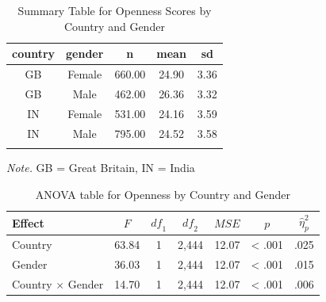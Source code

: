 \documentclass[
  english,
  man, fleqn, noextraspace]{apa6}
\begin{document}
\begin{table}[tbp]

\begin{center}
\begin{threeparttable}

\caption{\label{tab:anovaDescriptives}Summary Table for Openness Scores by Country and Gender}

\begin{tabular}{ccccc}
\toprule
country & \multicolumn{1}{c}{gender} & \multicolumn{1}{c}{n} & \multicolumn{1}{c}{mean} & \multicolumn{1}{c}{sd}\\
\midrule
GB & Female & 660.00 & 24.90 & 3.36\\
GB & Male & 462.00 & 26.36 & 3.32\\
IN & Female & 531.00 & 24.16 & 3.59\\
IN & Male & 795.00 & 24.52 & 3.58\\
\bottomrule
\addlinespace
\end{tabular}

\begin{tablenotes}[para]
\normalsize{\textit{Note.} GB = Great Britain, IN = India}
\end{tablenotes}

\end{threeparttable}
\end{center}

\end{table}

\begin{table}[tbp]

\begin{center}
\begin{threeparttable}

\caption{\label{tab:anovaResults}ANOVA table for Openness by Country and Gender}

\begin{tabular}{lrcrrrl}
\toprule
Effect & \multicolumn{1}{c}{$F$} & \multicolumn{1}{c}{$\mathit{df}_1$} & \multicolumn{1}{c}{$\mathit{df}_2$} & \multicolumn{1}{c}{$\mathit{MSE}$} & \multicolumn{1}{c}{$p$} & \multicolumn{1}{c}{$\hat{\eta}^2_p$}\\
\midrule
Country & 63.84 & 1 & 2,444 & 12.07 & < .001 & .025\\
Gender & 36.03 & 1 & 2,444 & 12.07 & < .001 & .015\\
Country $\times$ Gender & 14.70 & 1 & 2,444 & 12.07 & < .001 & .006\\
\bottomrule
\end{tabular}

\end{threeparttable}
\end{center}

\end{table}
\end{document}
